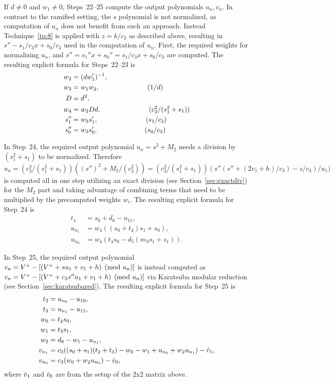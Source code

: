 If $d \neq 0$ and $w_1 \neq 0$, Steps~22--25 compute the output polynomials
$u_n, v_n$. In contrast to the ramified setting, the $s$ polynomial is not
normalized, as computation of $u_n$ does not benefit from such an approach.
Instead Technique~\ref{tq:8} is applied with $z = k/c_3$ as described above,
resulting in $s'' - s_1/c_3x + s_0/c_3$ used in the computation of $u_n$.
First, the required weights for normalizing $u_n$, and $s'' = s_1''x + s_0'' =
s_1/c_3x + s_0/c_3$ are computed. The resulting explicit formula for Steps~22--23 is
\begin{align*} 
    w_2 &= (dw_1')^{-1},\\
    w_3 &= w_1w_2, \quad\quad\quad\quad\quad\quad\quad (1/d)\\
    D   &= d^2,\\
    w_4 &= w_2Dd, \quad\quad\quad\quad\quad\quad\quad (c_3^2/(s_1^2 + s_1))\\
    s_1'' &= w_3s_1',\quad\quad\quad\quad\quad\quad\quad (s_1/c_3)\\
    s_0'' &= w_3s_0'.\quad\quad\quad\quad\quad\quad\quad (s_0/c_3)
\end{align*}

In Step~24, the required output polynomial $u_n = s^2 + M_2$ needs a division
by $(s_1^2 + s_1)$ to be normalized. Therefore 
$$ u_n = (c_3^2/(s_1^2 + s_1))((s'')^2 + M_2/(c_3^2)) = (c_3^2/(s_1^2 +
s_1))(s''(s'' + (2v_1+ h)/c_3) - z/c_3)/u_1)$$ is computed all in one step
utilizing an exact division (see Section~\ref{sec:exactdiv}) for the $M_2$ part and
taking advantage of combining terms that need to be multiplied by the
precomputed weights $w_i$. The resulting explicit formula for Step~24 is
\begin{align*}
    t_4     &= s_0 + d_6 - u_{11},\\
    u_{n_1} &= w_4((s_0 + t_4)s_1 + s_0),\\
    u_{n_0} &= w_4(t_4s_0 - d_5(m_3s_1 + z_1)).
\end{align*}

In Step~25, the required output polynomial $v_n = V^{+} - [(V^{+} + su_1 + v_1 + h)
\pmod{u_n}]$ is instead computed as $v_n = V^{+} - [(V^{+} + c_3s''u_1 + v_1 + h)
\pmod{u_n}]$ via Karatsuba modular reduction (see
Section~\ref{sec:karatsubared}). The resulting explicit formula for Step~25 is 
\begin{align*}  
    t_2 &= u_{n_0} - u_{10}, \\
    t_3 &= u_{n_1} - u_{11},\\
    w_0 &= t_2s_0,\\
    w_1 &= t_3s_1,\\    
    w_2 &= d_6 - w_1 - u_{n_1},\\
    v_{n_1} &= c_3((s_0 + s_1)(t_2 + t_3) - w_0 - w_1 + u_{n_0} + w_2u_{n_1}) - \hat{v}_1,\\
    v_{n_0} &= c_3(w_0 + w_2u_{n_0}) - \hat{v}_0,
\end{align*}
where $\hat{v}_1$ and $\hat{v}_0$ are from the setup of the 2x2 matrix above.

